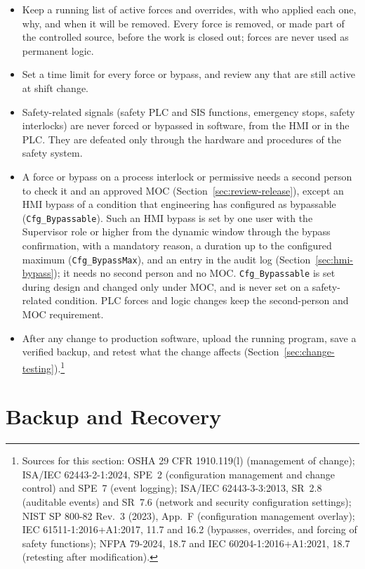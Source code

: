 \begin{itemize}[itemsep=1pt]
  \item Keep a running list of active forces and overrides, with who applied each one, why, and when it will be removed. Every force is removed, or made part of the controlled source, before the work is closed out; forces are never used as permanent logic.
  \item Set a time limit for every force or bypass, and review any that are still active at shift change.
  \item Safety-related signals (safety PLC and SIS functions, emergency stops, safety interlocks) are never forced or bypassed in software, from the HMI or in the PLC. They are defeated only through the hardware and procedures of the safety system.
  \item A force or bypass on a process interlock or permissive needs a second person to check it and an approved MOC (Section~\ref{sec:review-release}), except an HMI bypass of a condition that engineering has configured as bypassable (\texttt{Cfg\_Bypassable}). Such an HMI bypass is set by one user with the Supervisor role or higher from the dynamic window through the bypass confirmation, with a mandatory reason, a duration up to the configured maximum (\texttt{Cfg\_BypassMax}), and an entry in the audit log (Section~\ref{sec:hmi-bypass}); it needs no second person and no MOC. \texttt{Cfg\_Bypassable} is set during design and changed only under MOC, and is never set on a safety-related condition. PLC forces and logic changes keep the second-person and MOC requirement.
  \item After any change to production software, upload the running program, save a verified backup, and retest what the change affects (Section~\ref{sec:change-testing}).\footnote{Sources for this section: OSHA 29 CFR 1910.119(l) (management of change); ISA/IEC 62443-2-1:2024, SPE~2 (configuration management and change control) and SPE~7 (event logging); ISA/IEC 62443-3-3:2013, SR~2.8 (auditable events) and SR~7.6 (network and security configuration settings); NIST SP 800-82 Rev.~3 (2023), App.~F (configuration management overlay); IEC 61511-1:2016+A1:2017, 11.7 and 16.2 (bypasses, overrides, and forcing of safety functions); NFPA 79-2024, 18.7 and IEC 60204-1:2016+A1:2021, 18.7 (retesting after modification).}
\end{itemize}

\section{Backup and Recovery}\label{sec:backup}

